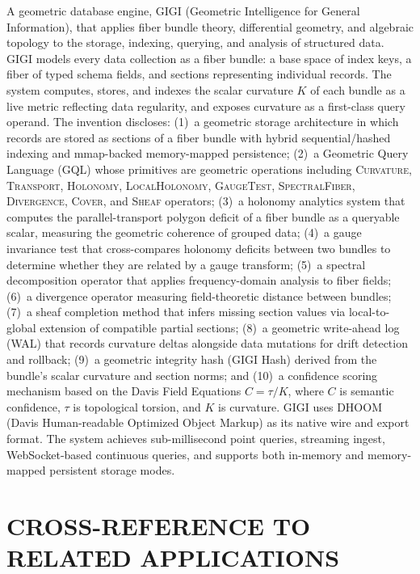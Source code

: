 \documentclass[11pt,letterpaper]{article}
\begin{document}
A geometric database engine, GIGI (Geometric Intelligence for General Information), that applies fiber bundle theory, differential geometry, and algebraic topology to the storage, indexing, querying, and analysis of structured data. GIGI models every data collection as a fiber bundle: a base space of index keys, a fiber of typed schema fields, and sections representing individual records. The system computes, stores, and indexes the scalar curvature $K$ of each bundle as a live metric reflecting data regularity, and exposes curvature as a first-class query operand. The invention discloses: (1)~a geometric storage architecture in which records are stored as sections of a fiber bundle with hybrid sequential/hashed indexing and mmap-backed memory-mapped persistence; (2)~a Geometric Query Language (GQL) whose primitives are geometric operations including \textsc{Curvature}, \textsc{Transport}, \textsc{Holonomy}, \textsc{LocalHolonomy}, \textsc{GaugeTest}, \textsc{SpectralFiber}, \textsc{Divergence}, \textsc{Cover}, and \textsc{Sheaf} operators; (3)~a holonomy analytics system that computes the parallel-transport polygon deficit of a fiber bundle as a queryable scalar, measuring the geometric coherence of grouped data; (4)~a gauge invariance test that cross-compares holonomy deficits between two bundles to determine whether they are related by a gauge transform; (5)~a spectral decomposition operator that applies frequency-domain analysis to fiber fields; (6)~a divergence operator measuring field-theoretic distance between bundles; (7)~a sheaf completion method that infers missing section values via local-to-global extension of compatible partial sections; (8)~a geometric write-ahead log (WAL) that records curvature deltas alongside data mutations for drift detection and rollback; (9)~a geometric integrity hash (GIGI Hash) derived from the bundle's scalar curvature and section norms; and (10)~a confidence scoring mechanism based on the Davis Field Equations $C = \tau/K$, where $C$ is semantic confidence, $\tau$ is topological torsion, and $K$ is curvature. GIGI uses DHOOM (Davis Human-readable Optimized Object Markup) as its native wire and export format. The system achieves sub-millisecond point queries, streaming ingest, WebSocket-based continuous queries, and supports both in-memory and memory-mapped persistent storage modes.


\newpage
\section*{CROSS-REFERENCE TO RELATED APPLICATIONS}
\end{document}
